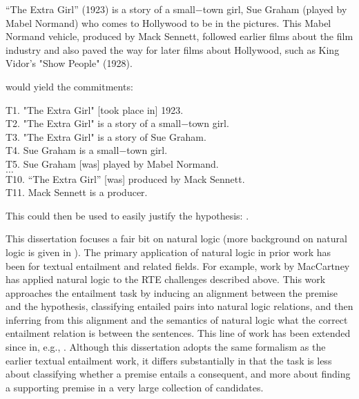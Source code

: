 \begin{displayquote}
``The Extra Girl'' (1923) is a story of a small−town girl, Sue Graham (played by Mabel Normand) who comes to
  Hollywood to be in the pictures. 
This Mabel Normand vehicle, produced by Mack Sennett, followed earlier
  films about the film industry and also paved the way for later films about Hollywood, such as King Vidor’s
  "Show People" (1928).
\end{displayquote}

would yield the commitments:

\begin{displayquote}
T1. "The Extra Girl" [took place in] 1923. \\
T2. "The Extra Girl" is a story of a small−town girl. \\
T3. "The Extra Girl" is a story of Sue Graham. \\
T4. Sue Graham is a small−town girl. \\
T5. Sue Graham [was] played by Mabel Normand. \\
$\dots$ \\
T10. ``The Extra Girl'' [was] produced by Mack Sennett. \\
T11. Mack Sennett is a producer.
\end{displayquote}

This could then be used to easily justify the hypothesis:
  .


This dissertation focuses a fair bit on natural logic (more background on natural logic is given in ).
The primary application of natural logic in prior work has been
  for textual entailment and related fields.
For example, work by MacCartney 
  \cite{key:2007maccartney-natlog,key:2008maccartney-natlog,key:2009maccartney-natlog,key:2009maccartney-natlog}
  has applied natural logic to the RTE challenges described above.
This work approaches the entailment task by inducing an alignment between the premise and the
  hypothesis, classifying entailed pairs into natural logic relations, and then inferring
  from this alignment and the semantics of natural logic what the correct entailment
  relation is between the sentences.
This line of work has been extended since in, e.g., .
Although this dissertation adopts the same formalism as the earlier textual entailment work,
  it differs substantially in that the task is less about classifying whether a premise entails
  a consequent, and more about finding a supporting premise in a very large collection of
  candidates.


